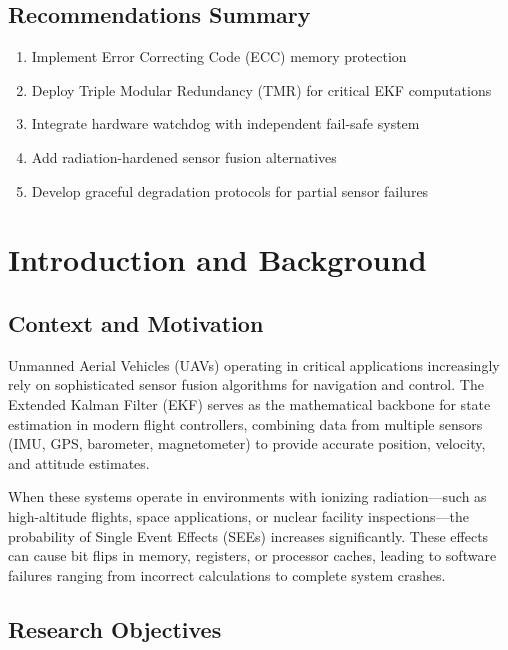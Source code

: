 \documentclass[11pt,a4paper]{article}
\begin{document}
\subsection{Recommendations Summary}

\begin{enumerate}[label=\arabic*)]
  \item Implement Error Correcting Code (ECC) memory protection
  \item Deploy Triple Modular Redundancy (TMR) for critical EKF computations
  \item Integrate hardware watchdog with independent fail-safe system
  \item Add radiation-hardened sensor fusion alternatives
  \item Develop graceful degradation protocols for partial sensor failures
\end{enumerate}

\section{Introduction and Background}

\subsection{Context and Motivation}

Unmanned Aerial Vehicles (UAVs) operating in critical applications increasingly rely on sophisticated sensor fusion algorithms for navigation and control. The Extended Kalman Filter (EKF) serves as the mathematical backbone for state estimation in modern flight controllers, combining data from multiple sensors (IMU, GPS, barometer, magnetometer) to provide accurate position, velocity, and attitude estimates.

When these systems operate in environments with ionizing radiation—such as high-altitude flights, space applications, or nuclear facility inspections—the probability of Single Event Effects (SEEs) increases significantly. These effects can cause bit flips in memory, registers, or processor caches, leading to software failures ranging from incorrect calculations to complete system crashes.

\subsection{Research Objectives}
\end{document}

